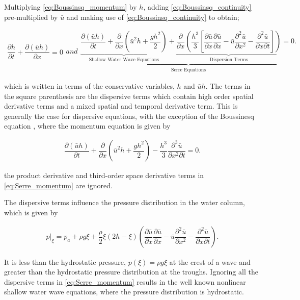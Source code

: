 \documentclass[SingleSpace,12pt]{Serre_ASCE}
\begin{document}
Multiplying \eqref{eq:Boussinsq_momentum} by $h$, adding \eqref{eq:Boussinsq_continuity} pre-multiplied by $\bar{u}$ and making use of \eqref{eq:Boussinsq_continuity} to obtain;
\begin{linenomath*}
\begin{subequations}\label{eq:Serre_conservative_form}
\begin{gather}
\dfrac{\partial h}{\partial t} + \dfrac{\partial (\bar{u}h)}{\partial x} = 0
\label{eq:Serre_continuity}
\end{gather}
and
\begin{gather}
\underbrace{\underbrace{\dfrac{\partial (\bar{u}h)}{\partial t} + \dfrac{\partial}{\partial x} \left ( \bar{u}^2h + \dfrac{gh^2}{2}\right )}_{\text{Shallow Water Wave Equations}} + \underbrace{\dfrac{\partial}{\partial x} \left (  \dfrac{h^3}{3} \left [ \dfrac{\partial \bar{u} }{\partial x} \dfrac{\partial \bar{u}}{\partial x} - \bar{u} \dfrac{\partial^2 \bar{u}}{\partial x^2}  - \dfrac{\partial^2 \bar{u}}{\partial x \partial t}\right ] \right )}_{\text{Dispersion Terms}} = 0.}_{\text{Serre Equations}}
\label{eq:Serre_momentum}
\end{gather}
\end{subequations}
\end{linenomath*}
which is written in terms of the conservative variables, $h$ and $\bar{u}h$. The terms in the square parenthesis are the dispersive terms which contain high order spatial derivative terms and a mixed spatial and temporal derivative term. This is generally the case for dispersive equations, with the exception of the Boussinesq equation \cite{Basco-D-1987}, where the momentum equation is given by
\begin{linenomath*}
\begin{gather}
\dfrac{\partial (\bar{u}h)}{\partial t} + \dfrac{\partial}{\partial x} \left ( \bar{u}^2h + \dfrac{gh^2}{2}\right ) - \dfrac{h^3}{3} \dfrac{\partial^3 \bar{u}}{\partial x^2 \partial t} = 0.
\end{gather}
\end{linenomath*}
the product derivative and third-order space derivative terms in \eqref{eq:Serre_momentum} are ignored.

The dispersive terms influence the pressure distribution in the water column, which is given by
\begin{linenomath*}
\begin{gather}\label{eq:pressure_serre}
p|_\xi = p_a + \rho g \xi + \dfrac{\rho}{2} \xi ( 2h - \xi ) \left ( \dfrac{\partial \bar{u}}{\partial x} \dfrac{\partial \bar{u}}{\partial x} - \bar{u} \dfrac{\partial^2 \bar{u}}{\partial x^2} -  \dfrac{\partial^2 \bar{u}}{\partial x \partial t} \right ).
\end{gather}
\end{linenomath*}
It is less than the hydrostatic pressure,  $p(\xi) = \rho g \xi$ at the crest of a wave and greater than the hydrostatic pressure distribution at the troughs. Ignoring all the dispersive terms in \eqref{eq:Serre_momentum} results in the well known nonlinear shallow water wave equations, where the pressure distribution is hydrostatic.
\end{document}
